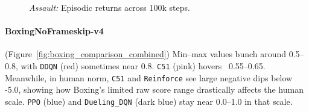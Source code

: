 \begin{figure} 
	\centering
	\quad
	\caption{\emph{Assault:} Episodic returns across 100k steps.}
	\label{fig:assault_comparison_combined}
\end{figure}

\paragraph{BoxingNoFrameskip-v4}
(Figure~\ref{fig:boxing_comparison_combined})
Min--max values bunch around 0.5--0.8, with \texttt{DDQN} (red) sometimes near 0.8. 
\texttt{C51} (pink) hovers ~0.55--0.65. Meanwhile, in human norm, 
\texttt{C51} and \texttt{Reinforce} see large negative dips below -5.0, 
showing how Boxing's limited raw score range drastically affects the human scale. 
\texttt{PPO} (blue) and \texttt{Dueling\_DQN} (dark blue) stay near 0.0--1.0 
in that scale.

